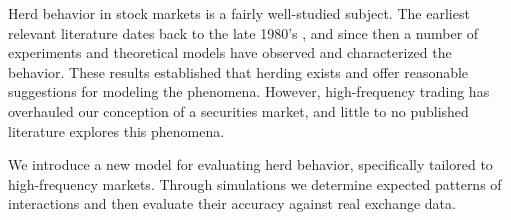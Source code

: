 \label{abstract}

Herd behavior in stock markets is a fairly well-studied subject.
The earliest relevant literature dates back to the late 1980's \cite{bikhchandani}, and since then a number of experiments and theoretical models have observed and characterized the behavior.
These results established that herding exists and offer reasonable suggestions for modeling the phenomena.
However, high-frequency trading has overhauled our conception of a securities market, and little to no published literature explores this phenomena.

We introduce a new model for evaluating herd behavior, specifically tailored to high-frequency markets.
Through simulations we determine expected patterns of interactions and then evaluate their accuracy against real exchange data.
